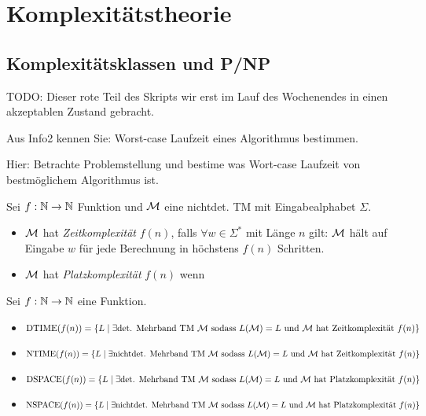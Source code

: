 \section[Komplexitätstheorie]{Komplexitätstheorie}
\subsection{Komplexitätsklassen und P/NP}

{\color{red} TODO: Dieser rote Teil des Skripts wir erst im Lauf des Wochenendes in einen akzeptablen Zustand gebracht.

Aus Info2 kennen Sie: Worst-case Laufzeit eines Algorithmus bestimmen.

Hier: Betrachte Problemstellung und bestime was Wort-case Laufzeit von bestmöglichem Algorithmus ist.

\begin{Def}
Sei $f:\mathbb{N}\rightarrow\mathbb{N}$ Funktion und $\mathcal{M}$ eine nichtdet. \ac{TM} mit Eingabealphabet $\Sigma$.
\begin{itemize}
 \item $\mathcal{M}$ hat \emph{Zeitkomplexität} $f(n)$, falls $\forall w\in\Sigma^*$ mit Länge $n$ gilt: $\mathcal{M}$ hält auf Eingabe $w$ für jede Berechnung in höchstens $f(n)$ Schritten.
 \item $\mathcal{M}$ hat \emph{Platzkomplexität} $f(n)$ wenn
\end{itemize}
\end{Def}


\begin{Def}[name={[$\NTIME$ Klasse]}]
	Sei $f:\N\->\N$ eine Funktion.
	\begin{itemize}
	 \item $\operatorname{DTIME}(f(n)) = \{L\mid \exists \text{det. Mehrband TM $\mathcal{M}$ sodass $L(\mathcal{M})=L$ und $\mathcal{M}$ hat Zeitkomplexität $f(n)$} \} $
	 \item $\operatorname{NTIME}(f(n)) = \{L\mid \exists \text{nichtdet. Mehrband TM $\mathcal{M}$ sodass $L(\mathcal{M})=L$ und $\mathcal{M}$ hat Zeitkomplexität $f(n)$} \} $
	 \item $\operatorname{DSPACE}(f(n)) = \{L\mid \exists \text{det. Mehrband TM $\mathcal{M}$ sodass $L(\mathcal{M})=L$ und $\mathcal{M}$ hat Platzkomplexität $f(n)$} \} $
	 \item $\operatorname{NSPACE}(f(n)) = \{L\mid \exists \text{nichtdet. Mehrband TM $\mathcal{M}$ sodass $L(\mathcal{M})=L$ und $\mathcal{M}$ hat Platzkomplexität $f(n)$} \} $
	\end{itemize}

\end{Def}

}
